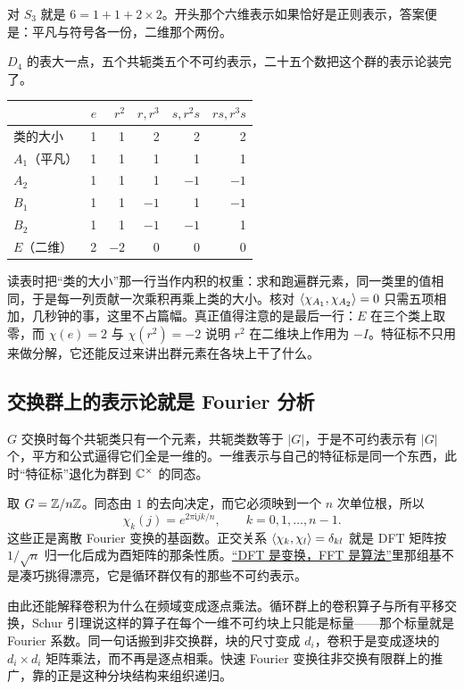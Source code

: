 对 \(S_3\) 就是 \(6=1+1+2\times2\)。开头那个六维表示如果恰好是正则表示，答案便是：平凡与符号各一份，二维那个两份。

\(D_4\) 的表大一点，五个共轭类五个不可约表示，二十五个数把这个群的表示论装完了。

{\def\LTcaptype{none}
\begin{longtable}{@{}lrrrrr@{}}
\toprule\noalign{}
 & \(e\) & \(r^2\) & \(r,r^3\) & \(s,r^2s\) & \(rs,r^3s\) \\
\midrule\noalign{}
\endhead
\bottomrule\noalign{}
\endlastfoot
类的大小 & 1 & 1 & 2 & 2 & 2 \\
\(A_1\)（平凡） & 1 & 1 & 1 & 1 & 1 \\
\(A_2\) & 1 & 1 & 1 & \(-1\) & \(-1\) \\
\(B_1\) & 1 & 1 & \(-1\) & 1 & \(-1\) \\
\(B_2\) & 1 & 1 & \(-1\) & \(-1\) & 1 \\
\(E\)（二维） & 2 & \(-2\) & 0 & 0 & 0 \\
\end{longtable}
}

读表时把``类的大小''那一行当作内积的权重：求和跑遍群元素，同一类里的值相同，于是每一列贡献一次乘积再乘上类的大小。核对 \(\left\langle\chi_{A_1},\chi_{A_2}\right\rangle=0\) 只需五项相加，几秒钟的事，这里不占篇幅。真正值得注意的是最后一行：\(E\) 在三个类上取零，而 \(\chi(e)=2\) 与 \(\chi(r^2)=-2\) 说明 \(r^2\) 在二维块上作用为 \(-I\)。特征标不只用来做分解，它还能反过来讲出群元素在各块上干了什么。

\subsection{交换群上的表示论就是 Fourier 分析}

\(G\) 交换时每个共轭类只有一个元素，共轭类数等于 \(|G|\)，于是不可约表示有 \(|G|\) 个，平方和公式逼得它们全是一维的。一维表示与自己的特征标是同一个东西，此时``特征标''退化为群到 \(\mathbb{C}^\times\) 的同态。

取 \(G=\mathbb{Z}/n\mathbb{Z}\)。同态由 \(1\) 的去向决定，而它必须映到一个 \(n\) 次单位根，所以
\[
\chi_k(j)=e^{2\pi\mathrm{i}jk/n},\qquad k=0,1,\ldots,n-1.
\]
这些正是离散 Fourier 变换的基函数。正交关系 \(\left\langle\chi_k,\chi_l\right\rangle=\delta_{kl}\) 就是 DFT 矩阵按 \(1/\sqrt n\) 归一化后成为酉矩阵的那条性质。\hyperref[sec:08-Numerical-Analysis/08-Fourier-and-Spectral-Methods/03]{``DFT 是变换，FFT 是算法''}里那组基不是凑巧挑得漂亮，它是循环群仅有的那些不可约表示。

由此还能解释卷积为什么在频域变成逐点乘法。循环群上的卷积算子与所有平移交换，Schur 引理说这样的算子在每个一维不可约块上只能是标量——那个标量就是 Fourier 系数。同一句话搬到非交换群，块的尺寸变成 \(d_i\)，卷积于是变成逐块的 \(d_i\times d_i\) 矩阵乘法，而不再是逐点相乘。快速 Fourier 变换往非交换有限群上的推广，靠的正是这种分块结构来组织递归。

